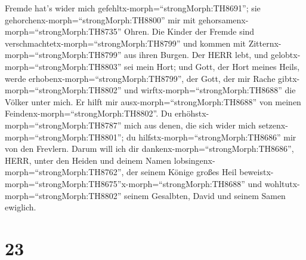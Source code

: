 Fremde hat's wider mich gefehltx-morph=``strongMorph:TH8691''; sie
gehorchenx-morph=``strongMorph:TH8800'' mir mit
gehorsamenx-morph=``strongMorph:TH8735'' Ohren.  Die Kinder
der Fremde sind verschmachtetx-morph=``strongMorph:TH8799'' und kommen
mit Zitternx-morph=``strongMorph:TH8799'' aus ihren Burgen.
 Der HERR lebt, und gelobtx-morph=``strongMorph:TH8803''
sei mein Hort; und Gott, der Hort meines Heils, werde
erhobenx-morph=``strongMorph:TH8799'',  der Gott, der mir
Rache gibtx-morph=``strongMorph:TH8802'' und
wirftx-morph=``strongMorph:TH8688'' die Völker unter mich. 
Er hilft mir ausx-morph=``strongMorph:TH8688'' von meinen
Feindenx-morph=``strongMorph:TH8802''. Du
erhöhstx-morph=``strongMorph:TH8787'' mich aus denen, die sich wider
mich setzenx-morph=``strongMorph:TH8801''; du
hilfstx-morph=``strongMorph:TH8686'' mir von den Frevlern. 
Darum will ich dir dankenx-morph=``strongMorph:TH8686'', HERR, unter den
Heiden und deinem Namen lobsingenx-morph=``strongMorph:TH8762'',
 der seinem Könige großes Heil
beweistx-morph=``strongMorph:TH8675''x-morph=``strongMorph:TH8688'' und
wohltutx-morph=``strongMorph:TH8802'' seinem Gesalbten, David und seinem
Samen ewiglich.

\hypertarget{section-22}{%
\section{23}\label{section-22}}

